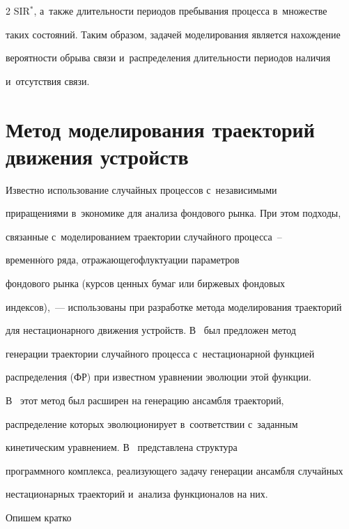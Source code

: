 \begin{multicols}{2}
SIR$^*$, а~также длительности периодов пребывания процесса в~множестве 


таких состояний. Таким образом, задачей моделирования является нахождение 


вероятности обрыва связи и~распределения длительности периодов наличия 


и~отсутствия связи.





\section{Метод моделирования траекторий движения устройств}





  Известно использование случайных процессов с~независимыми 


приращениями в~экономике для анализа фондового рынка. При этом подходы,\linebreak 


связанные с~моделированием траектории случайного процесса~-- 


временн$\acute{\mbox{о}}$го ряда, отражающего\linebreak флуктуации параметров 


фондового рынка (курсов ценных бумаг или биржевых фондовых  


индексов),~--- использованы при разработке метода моделирования траекторий 


для нестационарного движения устройств. В~\cite{15-g1} был предложен метод 


генерации траектории случайного процесса с~нестационарной функцией 


распределения (ФР) при известном уравнении эволюции этой функции.  


В~\cite{16-g1} этот метод был расширен на генерацию ансамбля траекторий, 


распределение которых эволюционирует в~соответствии с~заданным 


кинетическим уравнением. В~\cite{17-g1} представлена структура 


программного комплекса, реализующего задачу генерации ансамбля случайных 


нестационарных траекторий и~анализа функционалов на них. 





Опишем кратко 



\end{multicols}
